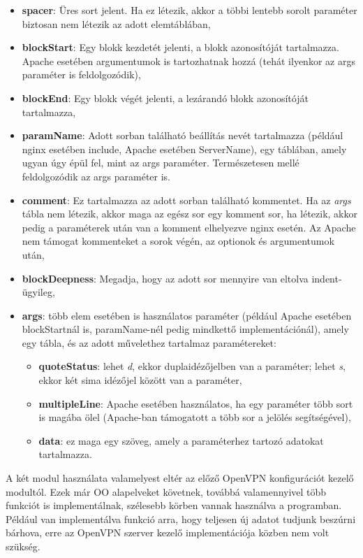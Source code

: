 \begin{itemize}
    \item \textbf{spacer}: Üres sort jelent. Ha ez létezik, akkor a többi lentebb sorolt paraméter biztosan nem létezik az adott elemtáblában,
    \item \textbf{blockStart}: Egy blokk kezdetét jelenti, a blokk azonosítóját tartalmazza. Apache esetében argumentumok is tartozhatnak hozzá (tehát ilyenkor az args paraméter is feldolgozódik),
    \item \textbf{blockEnd}: Egy blokk végét jelenti, a lezárandó blokk azonosítóját tartalmazza,
    \item \textbf{paramName}: Adott sorban található beállítás nevét tartalmazza (például nginx esetében include, Apache esetében ServerName), egy táblában, amely ugyan úgy épül fel, mint az args paraméter. Természetesen mellé feldolgozódik az args paraméter is.
    \item \textbf{comment}: Ez tartalmazza az adott sorban található kommentet. Ha az \textit{args} tábla nem létezik, akkor maga az egész sor egy komment sor, ha létezik, akkor pedig a paraméterek után van a komment elhelyezve nginx esetén. Az Apache nem támogat kommenteket a sorok végén, az optionok és argumentumok után,
    \item \textbf{blockDeepness}: Megadja, hogy az adott sor mennyire van eltolva indent-ügyileg,
    \item \textbf{args}: több elem esetében is használatos paraméter (például Apache esetében blockStartnál is, paramName-nél pedig mindkettő implementációnál), amely egy tábla, és az adott művelethez tartalmaz paramétereket:
        \begin{itemize}
            \item \textbf{quoteStatus}: lehet \textit{d}, ekkor duplaidézőjelben van a paraméter; lehet \textit{s}, ekkor két sima idézőjel között van a paraméter,
            \item \textbf{multipleLine}: Apache esetében használatos, ha egy paraméter több sort is magába ölel (Apache-ban támogatott a több sor a \texttt{\detokenize{\\}} jelölés segítségével),
            \item \textbf{data}: ez maga egy szöveg, amely a paraméterhez tartozó adatokat tartalmazza.
        \end{itemize}
\end{itemize}

A két modul használata valamelyest eltér az előző OpenVPN konfigurációt kezelő modultól. Ezek már OO alapelveket követnek, továbbá valamennyivel több funkciót is implementálnak, szélesebb körben vannak használva a programban. Például van implementálva funkció arra, hogy teljesen új adatot tudjunk beszúrni bárhova, erre az OpenVPN szerver kezelő implementációja közben nem volt szükség.


